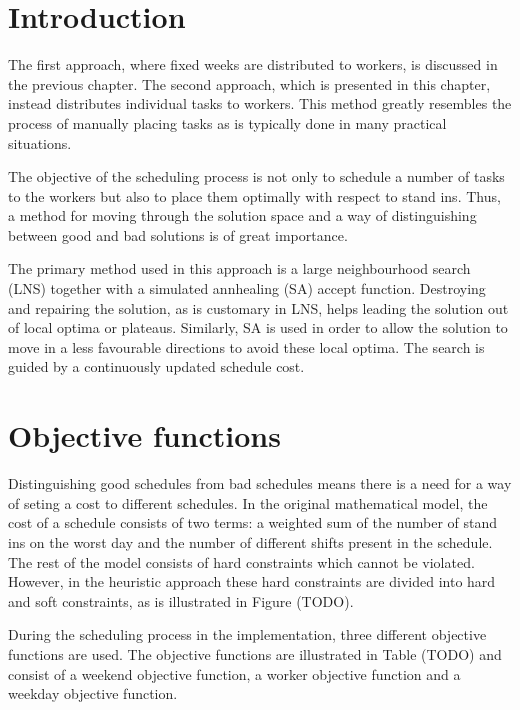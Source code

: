 
\section{Introduction}

The first approach, where fixed weeks are distributed to workers, is discussed in the previous chapter. The second approach, which is presented in this chapter, instead distributes individual tasks to workers. This method greatly resembles the process of manually placing tasks as is typically done in many practical situations. 

The objective of the scheduling process is not only to schedule a number of tasks to the workers but also to place them optimally with respect to stand ins. Thus, a method for moving through the solution space and a way of distinguishing between good and bad solutions is of great importance. 

The primary method used in this approach is a large neighbourhood search (LNS) together with a simulated annhealing (SA) accept function. Destroying and repairing the solution, as is customary in LNS, helps leading the solution out of local optima or plateaus. Similarly, SA is used in order to allow the solution to move in a less favourable directions to avoid these local optima. The 
search is guided by a continuously updated schedule cost.

\section{Objective functions}
Distinguishing good schedules from bad schedules means there is a need for a way of seting a cost to different schedules. In the original mathematical model, the cost of a schedule consists of two terms: a weighted sum of the number of stand ins on the worst day and the number of different shifts present in the schedule. The rest of the model consists of hard constraints which cannot be violated. However, in the heuristic approach these hard constraints are divided into hard and soft constraints, as is illustrated in Figure (TODO).

During the scheduling process in the implementation, three different objective functions are used. The objective functions are illustrated in Table (TODO) and consist of a weekend objective function, a worker objective function and a weekday objective function.


